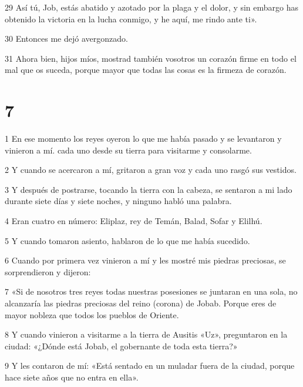 \par 29 Así tú, Job, estás abatido y azotado por la plaga y el dolor, y sin embargo has obtenido la victoria en la lucha conmigo, y he aquí, me rindo ante ti».

\par 30 Entonces me dejó avergonzado.

\par 31 Ahora bien, hijos míos, mostrad también vosotros un corazón firme en todo el mal que os suceda, porque mayor que todas las cosas es la firmeza de corazón.

\chapter{7}

\par 1 En ese momento los reyes oyeron lo que me había pasado y se levantaron y vinieron a mí. cada uno desde su tierra para visitarme y consolarme.

\par 2 Y cuando se acercaron a mí, gritaron a gran voz y cada uno rasgó sus vestidos.

\par 3 Y después de postrarse, tocando la tierra con la cabeza, se sentaron a mi lado durante siete días y siete noches, y ninguno habló una palabra.

\par 4 Eran cuatro en número: Eliplaz, rey de Temán, Balad, Sofar y Elilhú.

\par 5 Y cuando tomaron asiento, hablaron de lo que me había sucedido.

\par 6 Cuando por primera vez vinieron a mí y les mostré mis piedras preciosas, se sorprendieron y dijeron:

\par 7 «Si de nosotros tres reyes todas nuestras posesiones se juntaran en una sola, no alcanzaría las piedras preciosas del reino (corona) de Jobab. Porque eres de mayor nobleza que todos los pueblos de Oriente.

\par 8 Y cuando vinieron a visitarme a la tierra de Ausitis «Uz», preguntaron en la ciudad: «¿Dónde está Jobab, el gobernante de toda esta tierra?»

\par 9 Y les contaron de mí: «Está sentado en un muladar fuera de la ciudad, porque hace siete años que no entra en ella».

